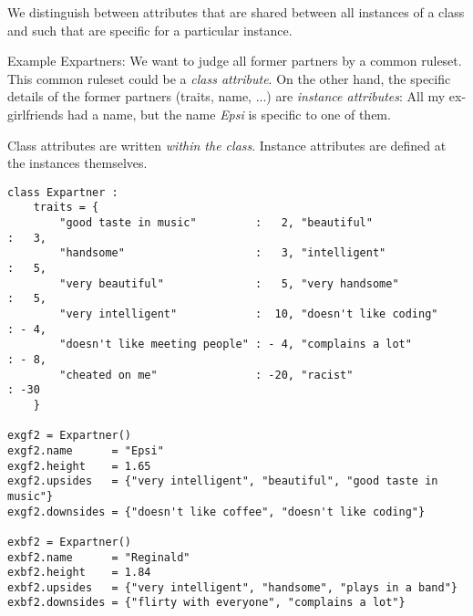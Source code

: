 
\begin{frame}
%
\begin{hintbox}
We distinguish between attributes that are shared between all instances of a class and such that are specific for a particular instance.

\vspace{3pt}
Example Expartners: We want to judge all former partners by a common ruleset. This common ruleset could be a \emph{class attribute}.
On the other hand, the specific details of the former partners (traits, name, ...) are \emph{instance attributes}: All my ex-girlfriends had a name, but the name \emph{Epsi} is specific to one of them.

\vspace{3pt}
Class attributes are written \emph{within the class}. Instance attributes are defined at the instances themselves.
\end{hintbox}
%
\end{frame}


\begin{frame}[fragile]
%
\vspace{-11pt}
\begin{codebox}
\begin{verbatim}
class Expartner :
    traits = {
        "good taste in music"         :   2, "beautiful"                   :   3,
        "handsome"                    :   3, "intelligent"                 :   5,
        "very beautiful"              :   5, "very handsome"               :   5,
        "very intelligent"            :  10, "doesn't like coding"         : - 4,
        "doesn't like meeting people" : - 4, "complains a lot"             : - 8,
        "cheated on me"               : -20, "racist"                      : -30
    }

exgf2 = Expartner()
exgf2.name      = "Epsi"
exgf2.height    = 1.65
exgf2.upsides   = {"very intelligent", "beautiful", "good taste in music"}
exgf2.downsides = {"doesn't like coffee", "doesn't like coding"}

exbf2 = Expartner()
exbf2.name      = "Reginald"
exbf2.height    = 1.84
exbf2.upsides   = {"very intelligent", "handsome", "plays in a band"}
exbf2.downsides = {"flirty with everyone", "complains a lot"}
\end{verbatim}
\end{codebox}
%
\end{frame}

